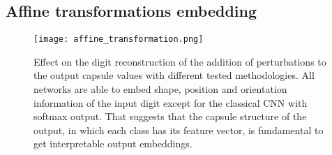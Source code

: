 \documentclass{article}
\begin{document}
\subsection{Affine transformations embedding}
\begin{figure}[t]
    \centering
    \texttt{[image: affine\_transformation.png]}
    \caption{Effect on the digit reconstruction of the addition of perturbations to the output capsule values with different tested methodologies. All networks are able to embed shape, position and orientation information of the input digit except for the classical CNN with softmax output. That suggests that the capsule structure of the output, in which each class has its feature vector, is fundamental to get interpretable output embeddings.}
    \label{fig:affine_transformation}
\end{figure}
\end{document}
